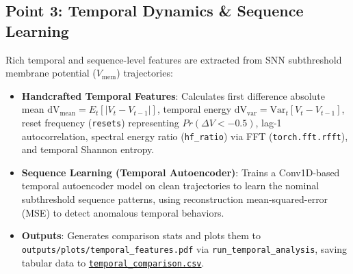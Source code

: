 \documentclass[11pt,a4paper]{article}
\begin{document}
\subsection{Point 3: Temporal Dynamics \& Sequence Learning}
Rich temporal and sequence-level features are extracted from SNN subthreshold membrane potential ($V_{\text{mem}}$) trajectories:
\begin{itemize}
    \item \textbf{Handcrafted Temporal Features}: Calculates first difference absolute mean $\text{dV}_{\text{mean}} = E_t[|V_t - V_{t-1}|]$, temporal energy $\text{dV}_{\text{var}} = \text{Var}_t[V_t - V_{t-1}]$, reset frequency (\texttt{resets}) representing $Pr(\Delta V < -0.5)$, lag-1 autocorrelation, spectral energy ratio (\texttt{hf\_ratio}) via FFT (\texttt{torch.fft.rfft}), and temporal Shannon entropy.
    \item \textbf{Sequence Learning (Temporal Autoencoder)}: Trains a Conv1D-based temporal autoencoder model on clean trajectories to learn the nominal subthreshold sequence patterns, using reconstruction mean-squared-error (MSE) to detect anomalous temporal behaviors.
    \item \textbf{Outputs}: Generates comparison stats and plots them to \texttt{outputs/plots/temporal\_features.pdf} via \texttt{run\_temporal\_analysis}, saving tabular data to \href{run:outputs/tables/temporal_comparison.csv}{\texttt{temporal\_comparison.csv}}.
\end{itemize}
\end{document}
